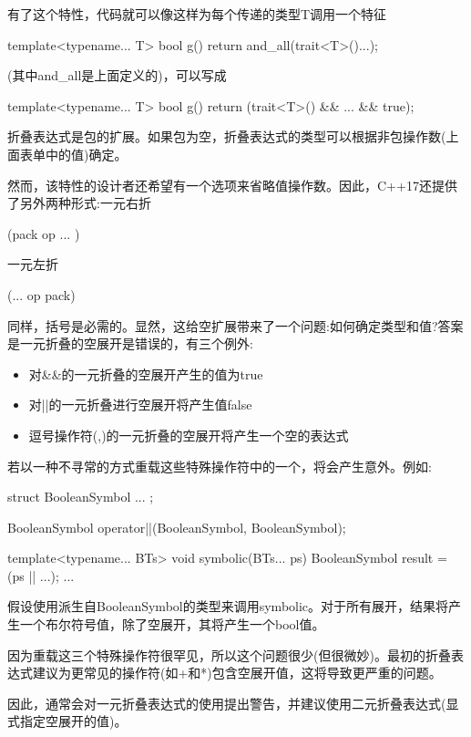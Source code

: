 有了这个特性，代码就可以像这样为每个传递的类型T调用一个特征

\begin{cpp}
template<typename... T> bool g() {
	return and_all(trait<T>()...);
}
\end{cpp}

(其中and\_all是上面定义的)，可以写成

\begin{cpp}
template<typename... T> bool g() {
	return (trait<T>() && ... && true);
}
\end{cpp}

折叠表达式是包的扩展。如果包为空，折叠表达式的类型可以根据非包操作数(上面表单中的值)确定。

然而，该特性的设计者还希望有一个选项来省略值操作数。因此，C++17还提供了另外两种形式:一元右折

\begin{cpp}
(pack op ... )
\end{cpp}

一元左折

\begin{cpp}
(... op pack)
\end{cpp}

同样，括号是必需的。显然，这给空扩展带来了一个问题:如何确定类型和值?答案是一元折叠的空展开是错误的，有三个例外:

\begin{itemize}
\item
对\&\&的一元折叠的空展开产生的值为true

\item
对||的一元折叠进行空展开将产生值false

\item
逗号操作符(,)的一元折叠的空展开将产生一个空的表达式
\end{itemize}

若以一种不寻常的方式重载这些特殊操作符中的一个，将会产生意外。例如:

\begin{cpp}
struct BooleanSymbol {
	...
};

BooleanSymbol operator||(BooleanSymbol, BooleanSymbol);

template<typename... BTs> void symbolic(BTs... ps) {
	BooleanSymbol result = (ps || ...);
	...
}
\end{cpp}

假设使用派生自BooleanSymbol的类型来调用symbolic。对于所有展开，结果将产生一个布尔符号值，除了空展开，其将产生一个bool值。

\begin{notice}
因为重载这三个特殊操作符很罕见，所以这个问题很少(但很微妙)。最初的折叠表达式建议为更常见的操作符(如+和*)包含空展开值，这将导致更严重的问题。
\end{notice}

因此，通常会对一元折叠表达式的使用提出警告，并建议使用二元折叠表达式(显式指定空展开的值)。







